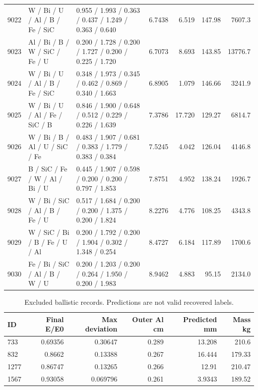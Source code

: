 \begin{landscape}
\begin{longtable}{rllrrrr}
9022 & W / Bi / U / Al / B / Fe / SiC & 0.955 / 1.993 / 0.363 / 0.437 / 1.249 / 0.363 / 0.640 & 6.7438 & 6.519 & 147.98 & 7607.3\\

9023 & Al / Bi / B / W / SiC / Fe / U & 0.200 / 1.728 / 0.200 / 1.727 / 0.200 / 0.225 / 1.720 & 6.7073 & 8.693 & 143.85 & 13776.7\\

9024 & W / Bi / U / Al / B / Fe / SiC & 0.348 / 1.973 / 0.345 / 0.462 / 0.869 / 0.340 / 1.663 & 6.8905 & 1.079 & 146.66 & 3241.9\\

9025 & W / Bi / U / Al / Fe / SiC / B & 0.846 / 1.900 / 0.648 / 0.512 / 0.229 / 0.226 / 1.639 & 7.3786 & 17.720 & 129.27 & 6814.7\\

9026 & W / Bi / B / Al / U / SiC / Fe & 0.483 / 1.907 / 0.681 / 0.383 / 1.779 / 0.383 / 0.384 & 7.5245 & 4.042 & 126.04 & 4146.8\\

9027 & B / SiC / Fe / W / Al / Bi / U & 0.445 / 1.907 / 0.598 / 0.200 / 0.200 / 0.797 / 1.853 & 7.8751 & 4.952 & 138.24 & 1926.7\\

9028 & W / Bi / SiC / Al / B / Fe / U & 0.517 / 1.684 / 0.200 / 0.200 / 1.375 / 0.200 / 1.824 & 8.2276 & 4.776 & 108.25 & 4343.8\\

9029 & W / SiC / Bi / B / Fe / U / Al & 0.200 / 1.792 / 0.200 / 1.904 / 0.302 / 1.348 / 0.254 & 8.4727 & 6.184 & 117.89 & 1700.6\\

9030 & Fe / Bi / SiC / Al / B / W / U & 0.200 / 1.203 / 0.200 / 0.264 / 1.950 / 0.200 / 1.983 & 8.9462 & 4.883 & 95.15 & 2134.0\\

\bottomrule\end{longtable}\end{landscape}

\begin{table}[H]\centering\scriptsize
\caption{Excluded ballistic records. Predictions are not valid recovered labels.}
\begin{tabular}{@{}lrrrrr@{}}
\toprule ID & Final E/E0 & Max deviation & Outer Al cm & Predicted mm & Mass kg\\\midrule
733 & 0.69356 & 0.30647 & 0.289 & 13.208 & 210.6\\
832 & 0.8662 & 0.13388 & 0.267 & 16.444 & 179.33\\
1277 & 0.86747 & 0.13265 & 0.266 & 12.91 & 210.47\\
1567 & 0.93058 & 0.069796 & 0.261 & 3.9343 & 189.52\\
\bottomrule\end{tabular}\end{table}


